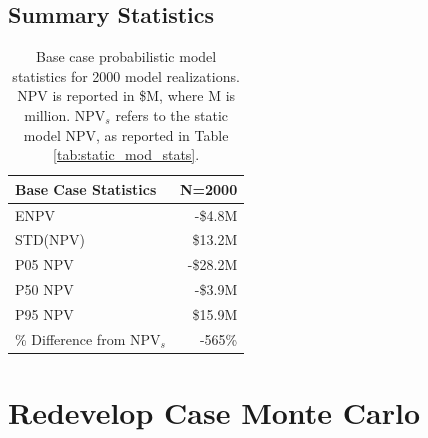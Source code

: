 \subsection{Summary Statistics}
\label{ch6:base_stats}

\begin{table}[!htp]
\centering
\begin{tabular}{|l|r|}
\hline
\textbf{Base Case Statistics} & N=2000 \\ \hline
ENPV & -\$4.8M \\ \hline
STD(NPV) & \$13.2M \\ \hline
P05 NPV & -\$28.2M \\ \hline
P50 NPV & -\$3.9M \\ \hline
P95 NPV & \$15.9M \\ \hline
\% Difference from NPV$_{s}$ & -565\% \\ \hline
\end{tabular}
\caption[Probabilistic Base Case statistics]{Base case probabilistic model statistics for 2000 model realizations. NPV is reported in \$M, where M is million. NPV$_s$ refers to the static model NPV, as reported in Table \ref{tab:static_mod_stats}.}
\label{tab:base_stats}
\end{table}


\section{Redevelop Case Monte Carlo}

